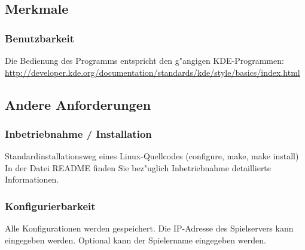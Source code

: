 \subsection{Merkmale}

\subsubsection{Benutzbarkeit}
Die Bedienung des Programms entspricht den g"angigen KDE-Programmen:\\
\href{http://developer.kde.org/documentation/standards/kde/style/basics/index.html}{http://developer.kde.org/documentation/standards/kde/style/basics/index.html}

\subsection{Andere Anforderungen}

\subsubsection{Inbetriebnahme / Installation}
Standardinstallationsweg eines Linux-Quellcodes (configure, make, make install)
In der Datei README finden Sie bez"uglich Inbetriebnahme detaillierte Informationen.

\subsubsection{Konfigurierbarkeit}
Alle Konfigurationen werden gespeichert. Die IP-Adresse des Spielservers kann eingegeben werden.
Optional kann der Spielername eingegeben werden.





